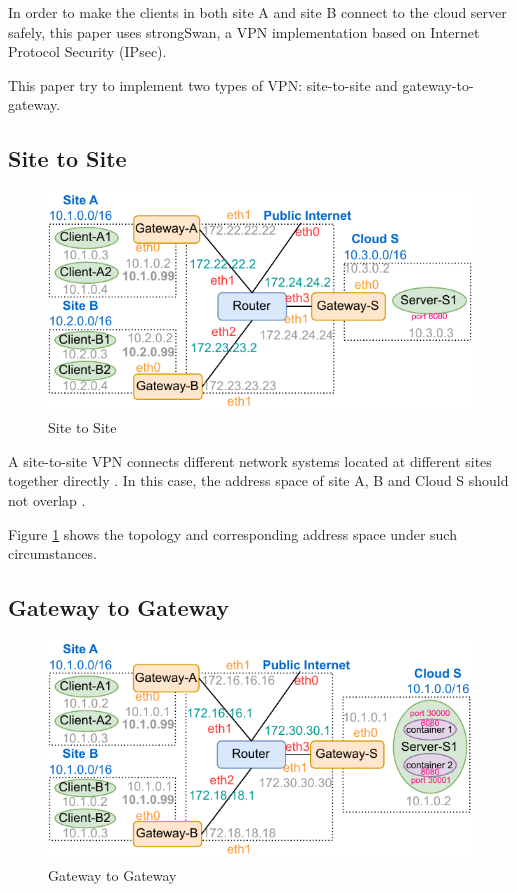 \documentclass[article]{aaltoseries}
\begin{document}
In order to make the clients in both site A and site B connect to the cloud server safely, this paper uses strongSwan, a VPN implementation based on Internet Protocol Security (IPsec).

This paper try to implement two types of VPN: site-to-site and gateway-to-gateway.

\subsection{Site to Site}
\begin{figure}[t!]
  \begin{center}
    \includegraphics[width=1.1\textwidth]{figures/site-to-site.pdf}
    \caption{Site to Site}
    \label{fig:site2site}
  \end{center}
\end{figure}

A site-to-site VPN connects different network systems located at different sites together directly \cite{9022848}. In this case, the address space of site A, B and Cloud S should not overlap \cite{AKYILDIZ2023100695}.

Figure \ref{fig:site2site} shows the topology and corresponding address space under such circumstances.

\subsection{Gateway to Gateway}
\begin{figure}[t!]
  \begin{center}
    \includegraphics[width=1.1\textwidth]{figures/gateway-to-gateway.pdf}
    \caption{Gateway to Gateway}
    \label{fig:gateway2gateway}
  \end{center}
\end{figure}
\end{document}
